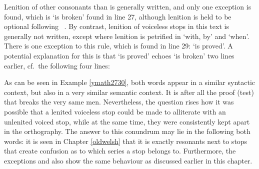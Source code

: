 Lenition of other consonants than  is generally written, and only one exception is found, which is  `is broken' found in line 27, although lenition is held to be optional following ~\autocite[380]{morgan_y_1952}. By contrast, lenition of voiceless stops in this text is generally not written, except where lenition is petrified in  `with, by' and  `when'. There is one exception to this rule, which is found in line 29:  `is proved'. A potential explanation for this is that  `is proved' echoes  `is broken' two lines earlier, cf.\ the following four lines:

As can be seen in Example \ref{ymath2730}, both words appear in a similar syntactic context, but also in a very similar semantic context. It is after all the proof (\ie test) that breaks the very same men. Nevertheless, the question rises how it was possible that a lenited voiceless stop could be made to alliterate with an unlenited voiced stop, while at the same time, they were consistently kept apart in the orthography. The answer to this conundrum may lie in the  following both words: it is seen in Chapter \ref{oldwelsh} that it is exactly resonants next to stops that create confusion as to which series a stop belongs to. Furthermore, the exceptions  and  also show the same behaviour as  discussed earlier in this chapter.

